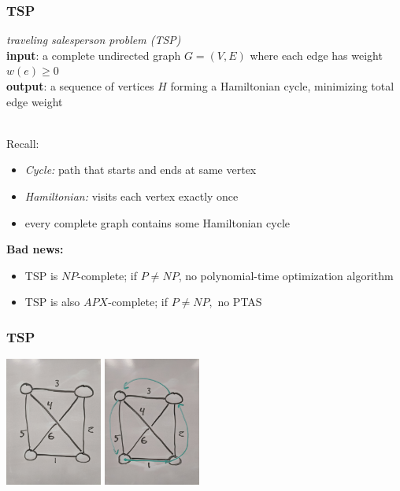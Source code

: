 \documentclass{beamer}
\newcommand{\stanza}{ \\~\ }
\begin{document}
\begin{frame} \frametitle{TSP}
\emph{traveling salesperson problem (TSP)} \\
\textbf{input}: a complete undirected graph $G=(V,E)$ where each edge has weight $w(e) \geq 0$ \\
\textbf{output}: a sequence of vertices $H$ forming a Hamiltonian cycle, minimizing
total edge weight
\stanza

Recall:
\begin{itemize}
  \item \emph{Cycle:} path that starts and ends at same vertex
  \item \emph{Hamiltonian:} visits each vertex exactly once
  \item every complete graph contains some Hamiltonian cycle
\end{itemize}

\textbf{Bad news:}
\begin{itemize}
  \item TSP is $NP$-complete; if $P \ne NP$, no polynomial-time optimization algorithm
  \item TSP is also $APX$-complete; if $P \ne NP,$ no PTAS
\end{itemize}
\end{frame}

\begin{frame} \frametitle{TSP}
  \begin{center}
    \includegraphics[height=120pt]{13-tsp-input.jpg}
    \includegraphics[height=120pt]{13-tsp-output.jpg}
  \end{center}
\end{frame}
\end{document}
